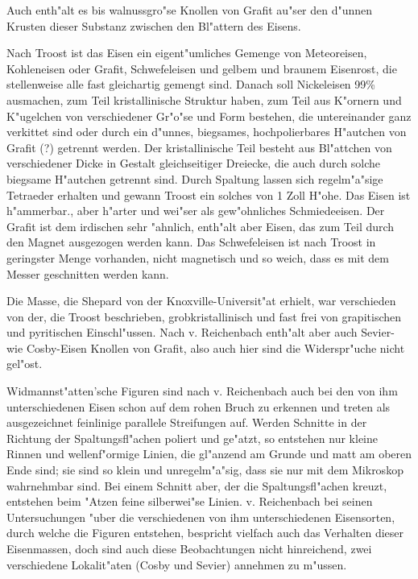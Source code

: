 \documentclass[a4paper, 11pt, oneside]{article}
\begin{document}
Auch enth"alt es bis walnussgro"se Knollen von Grafit au"ser den d"unnen Krusten dieser Substanz zwischen den Bl"attern des Eisens.

Nach Troost ist das Eisen ein eigent"umliches Gemenge von Meteoreisen, Kohleneisen oder Grafit, Schwefeleisen und gelbem und braunem Eisenrost, die stellenweise alle fast gleichartig gemengt sind. Danach soll Nickeleisen 99\% ausmachen, zum Teil kristallinische Struktur haben, zum Teil aus K"ornern und K"ugelchen von verschiedener Gr"o"se und Form bestehen, die untereinander ganz verkittet sind oder durch ein d"unnes, biegsames, hochpolierbares H"autchen von Grafit (?) getrennt werden. Der kristallinische Teil besteht aus Bl"attchen von verschiedener Dicke in Gestalt gleichseitiger Dreiecke, die auch durch solche biegsame H"autchen getrennt sind. Durch Spaltung lassen sich regelm"a"sige Tetraeder erhalten und gewann Troost ein solches von 1 Zoll H"ohe. Das Eisen ist h"ammerbar., aber h"arter und wei"ser als gew"ohnliches Schmiedeeisen. Der Grafit ist dem irdischen sehr "ahnlich, enth"alt aber Eisen, das zum Teil durch den Magnet ausgezogen werden kann. Das Schwefeleisen ist nach Troost in geringster Menge vorhanden, nicht magnetisch und so weich, dass es mit dem Messer geschnitten werden kann.

Die Masse, die Shepard von der Knoxville-Universit"at erhielt, war verschieden von der, die Troost beschrieben, grobkristallinisch und fast frei von grapitischen und pyritischen Einschl"ussen. Nach v. Reichenbach enth"alt aber auch Sevier- wie Cosby-Eisen Knollen von Grafit, also auch hier sind die Widerspr"uche nicht gel"ost.

Widmannst"atten'sche Figuren sind nach v. Reichenbach auch bei den von ihm unterschiedenen Eisen schon auf dem rohen Bruch zu erkennen und treten als ausgezeichnet feinlinige parallele Streifungen auf. Werden Schnitte in der Richtung der Spaltungsfl"achen poliert und ge"atzt, so entstehen nur kleine Rinnen und wellenf"ormige Linien, die gl"anzend am Grunde und matt am oberen Ende sind; sie sind so klein und unregelm"a"sig, dass sie nur mit dem Mikroskop wahrnehmbar sind. Bei einem Schnitt aber, der die Spaltungsfl"achen kreuzt, entstehen beim "Atzen feine silberwei"se Linien. v. Reichenbach bei seinen Untersuchungen "uber die verschiedenen von ihm unterschiedenen Eisensorten, durch welche die Figuren entstehen, bespricht vielfach auch das Verhalten dieser Eisenmassen, doch sind auch diese Beobachtungen nicht hinreichend, zwei verschiedene Lokalit"aten (Cosby und Sevier) annehmen zu m"ussen.
\end{document}
